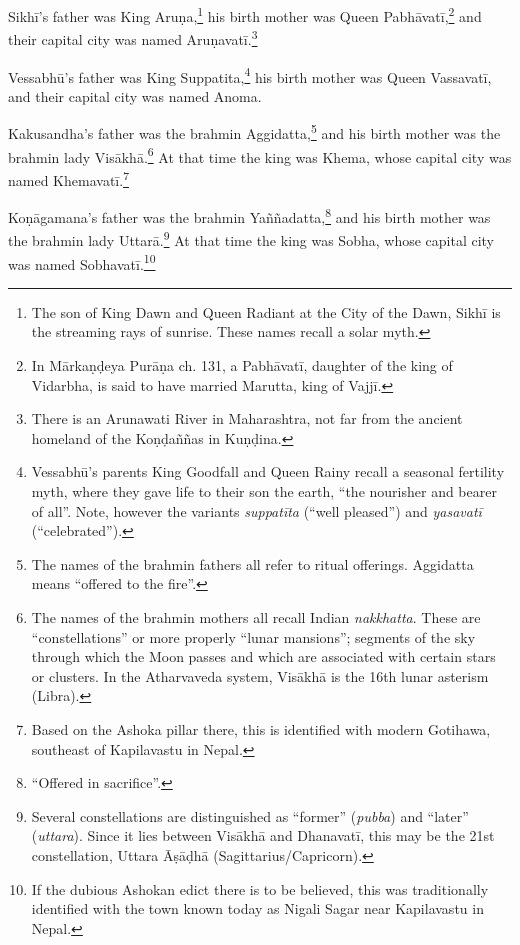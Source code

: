 \documentclass[12pt,openany]{book}%
\begin{document}
\textsanskrit{Sikhī}’s father was King \textsanskrit{Aruṇa},\footnote{The son of King Dawn and Queen Radiant at the City of the Dawn, \textsanskrit{Sikhī} is the streaming rays of sunrise. These names recall a solar myth. } his birth mother was Queen \textsanskrit{Pabhāvatī},\footnote{In \textsanskrit{Mārkaṇḍeya} \textsanskrit{Purāṇa} ch. 131, a \textsanskrit{Pabhāvatī}, daughter of the king of Vidarbha, is said to have married Marutta, king of \textsanskrit{Vajjī}. } and their capital city was named \textsanskrit{Aruṇavatī}.\footnote{There is an Arunawati River in Maharashtra, not far from the ancient homeland of the \textsanskrit{Koṇḍaññas} in \textsanskrit{Kuṇḍina}. } 

\textsanskrit{Vessabhū}’s father was King Suppatita,\footnote{\textsanskrit{Vessabhū}’s parents King Goodfall and Queen Rainy recall a seasonal fertility myth, where they gave life to their son the earth, “the nourisher and bearer of all”. Note, however the variants \textit{\textsanskrit{suppatīta}} (“well pleased”) and \textit{\textsanskrit{yasavatī}} (“celebrated”). } his birth mother was Queen \textsanskrit{Vassavatī}, and their capital city was named Anoma. 

Kakusandha’s father was the brahmin Aggidatta,\footnote{The names of the brahmin fathers all refer to ritual offerings. Aggidatta means “offered to the fire”. } and his birth mother was the brahmin lady \textsanskrit{Visākhā}.\footnote{The names of the brahmin mothers all recall Indian \textit{nakkhatta}. These are “constellations” or more properly “lunar mansions”; segments of the sky through which the Moon passes and which are associated with certain stars or clusters. In the Atharvaveda system, \textsanskrit{Visākhā} is the 16th lunar asterism (Libra). } At that time the king was Khema, whose capital city was named \textsanskrit{Khemavatī}.\footnote{Based on the Ashoka pillar there, this is identified with modern Gotihawa, southeast of Kapilavastu in Nepal. } 

\textsanskrit{Koṇāgamana}’s father was the brahmin \textsanskrit{Yaññadatta},\footnote{“Offered in sacrifice”. } and his birth mother was the brahmin lady \textsanskrit{Uttarā}.\footnote{Several constellations are distinguished as “former” (\textit{pubba}) and “later” (\textit{uttara}). Since it lies between \textsanskrit{Visākhā} and \textsanskrit{Dhanavatī}, this may be the 21st constellation, Uttara \textsanskrit{Āṣāḍhā} (Sagittarius/Capricorn). } At that time the king was Sobha, whose capital city was named \textsanskrit{Sobhavatī}.\footnote{If the dubious Ashokan edict there is to be believed, this was traditionally identified with the town known today as Nigali Sagar near Kapilavastu in Nepal. } 
\end{document}
